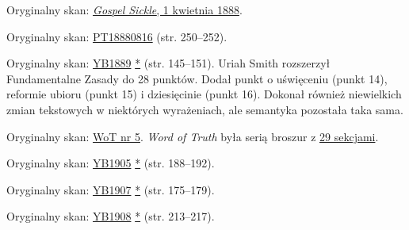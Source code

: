 
Oryginalny skan: \href{https://adventistdigitallibrary.org/adl-410336/gospel-sickle-april-1-1888?view_only=true&solr_nav%5Bid%5D=ff4d7f3f77b9bdf9e9ac&solr_nav%5Bpage%5D=0&solr_nav%5Boffset%5D=6}{\textit{Gospel Sickle}, 1 kwietnia 1888}.


Oryginalny skan: \href{https://adventistdigitallibrary.org/adl-402854/present-truth-august-16-1888?view_only=true&solr_nav%5Bid%5D=ff4d7f3f77b9bdf9e9ac&solr_nav%5Bpage%5D=0&solr_nav%5Boffset%5D=13}{PT18880816} (str. 250--252).


Oryginalny skan: \href{https://documents.adventistarchives.org/Yearbooks/YB1889.pdf#search=Yearbook%201889}{YB1889} \href{https://forgotten-pillar.s3.us-east-2.amazonaws.com/YB1889.pdf}{*} (str. 145--151). Uriah Smith rozszerzył Fundamentalne Zasady do 28 punktów. Dodał punkt o uświęceniu (punkt 14), reformie ubioru (punkt 15) i dziesięcinie (punkt 16). Dokonał również niewielkich zmian tekstowych w niektórych wyrażeniach, ale semantyka pozostała taka sama.


Oryginalny skan: \href{https://adl.b2.adventistdigitallibrary.org/concern/published_works/4ffda25e-a06b-48d4-8ace-67cdcd33726f}{WoT nr 5}.
\textit{Word of Truth} była serią broszur z \href{https://adl.b2.adventistdigitallibrary.org/concern/parent/22267078_fundamental_principles_of_seventh_day_adventists/published_works/94a22141-33e8-4b9a-b397-2fe48c17bec4}{29 sekcjami}.


Oryginalny skan: \href{https://documents.adventistarchives.org/Yearbooks/YB1905.pdf#search=Yearbook%201905}{YB1905} \href{https://forgotten-pillar.s3.us-east-2.amazonaws.com/YB1905.pdf}{*} (str. 188--192).


Oryginalny skan: \href{https://documents.adventistarchives.org/Yearbooks/YB1907.pdf#search=Yearbook%201906}{YB1907} \href{https://forgotten-pillar.s3.us-east-2.amazonaws.com/YB1907.pdf}{*} (str. 175--179).


Oryginalny skan: \href{https://documents.adventistarchives.org/Yearbooks/YB1908.pdf#search=Yearbook%201906}{YB1908} \href{https://forgotten-pillar.s3.us-east-2.amazonaws.com/YB1908.pdf}{*} (str. 213--217).

